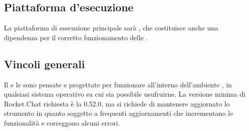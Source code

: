 \subsection{Piattaforma d'esecuzione}
La piattaforma di esecuzione principale sarà , che costituisce anche una dipendenza per il corretto funzionamento delle .

\subsection{Vincoli generali}
Il  e le  sono pensate e progettate per funzionare all'interno dell'ambiente , in qualsiasi sistema operativo su cui sia possibile usufruirne. La versione minima di Rocket.Chat richiesta è la 0.52.0, ma si richiede di mantenere aggiornato lo strumento in quanto soggetto a frequenti aggiornamenti che incrementano le funzionalità e correggono alcuni errori.



